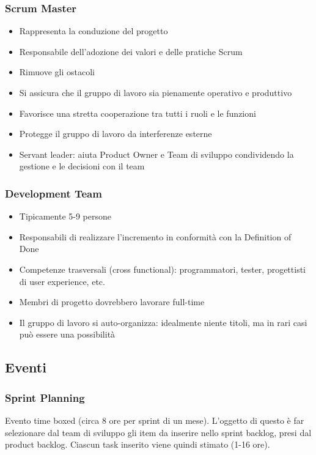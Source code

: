 \documentclass[10pt, a4paper]{article}
\begin{document}
\subsubsection*{Scrum Master}
\begin{itemize}
	\item Rappresenta la conduzione del progetto
	\item Responsabile dell’adozione dei valori e delle pratiche Scrum
	\item Rimuove gli ostacoli 
	\item Si assicura che il gruppo di lavoro sia pienamente operativo e produttivo
	\item Favorisce una stretta cooperazione tra tutti i ruoli e le funzioni
	\item Protegge il gruppo di lavoro da interferenze esterne
	\item Servant leader: aiuta Product Owner e Team di sviluppo condividendo la gestione e le decisioni con il team
\end{itemize}

\subsubsection*{Development Team}
\begin{itemize}
	\item Tipicamente 5-9 persone
	\item Responsabili di realizzare l’incremento in conformità con la Definition of Done
	\item Competenze trasversali (cross functional): programmatori, tester, progettisti di user experience, etc.
	\item Membri di progetto dovrebbero lavorare full-time
	\item Il gruppo di lavoro si auto-organizza: idealmente niente titoli, ma in rari casi può essere una possibilità
\end{itemize}

\subsection{Eventi}
\subsubsection*{Sprint Planning}
Evento time boxed (circa 8 ore per sprint di un mese). L'oggetto di questo è far selezionare dal team di sviluppo gli item da inserire nello sprint backlog, presi dal product backlog. Ciascun task inserito viene quindi stimato (1-16 ore).
\end{document}
